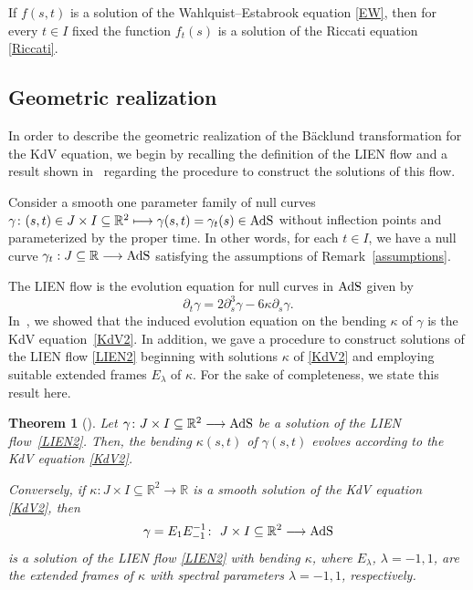 \documentclass[pdftex]{sigma}
\numberwithin{equation}{section}
\newtheorem{Theorem}{Theorem}[section]
\def\bending{\kappa}
\def\R{\mathbb{R}}
\def\AdS{{\rm AdS}}
\begin{document}
\begin{Remark}\label{WE-R}
	If $f(s,t)$ is a solution of the Wahlquist--Estabrook equation \eqref{EW}, then for every $t\in I$ fixed the function $f_t(s)$ is a solution of the Riccati equation \eqref{Riccati}.
\end{Remark}

\subsection{Geometric realization}

In order to describe the geometric realization of the B\"{a}cklund transformation for the KdV equation, we begin by recalling the definition of the LIEN flow and a result shown in~\cite{MP} regarding the procedure to construct the solutions of this flow.

Consider a smooth one parameter family of null curves $\gamma\colon (s,t)\in J\times I\subseteq\R^2\longmapsto \gamma(s,t)=\gamma_t(s)\in\AdS$ without inflection points and parameterized by the proper time. In other words, for each $t\in I$, we have a null curve $\gamma_t:J\subseteq\R\longrightarrow\AdS$ satisfying the assumptions of Remark~\ref{assumptions}.

The LIEN flow is the evolution equation for null curves in $\AdS$ given by
\begin{equation}\label{LIEN2}
	\partial_t\gamma=2\partial_s^3\gamma-6\bending\partial_s\gamma.
\end{equation}
In~\cite{MP}, we showed that the induced evolution equation on the bending $\bending$ of $\gamma$ is the KdV equation~\eqref{KdV2}. In addition, we gave a procedure to construct solutions of the LIEN flow \eqref{LIEN2} beginning with solutions $\bending$ of \eqref{KdV2} and employing suitable extended frames $E_\lambda$ of $\bending$. For the sake of completeness, we state this result here.

\begin{Theorem}[{\cite[Theorem 4.2]{MP}}]\label{induced}
	Let $\gamma\colon J\times I\subseteq\R^2\longrightarrow\AdS$ be a solution of the LIEN flow~\eqref{LIEN2}. Then, the bending $\bending(s,t)$ of $\gamma(s,t)$ evolves according to the KdV equation \eqref{KdV2}.
	
	Conversely, if $\bending\colon J\times I\subseteq\R^2\longrightarrow\R$ is a smooth solution of the KdV equation \eqref{KdV2}, then
	\begin{equation*}%
		\gamma=E_1E_{-1}^{-1}\colon\ J\times I\subseteq\R^2\longrightarrow\AdS
	\end{equation*}
	is a solution of the LIEN flow \eqref{LIEN2} with bending $\bending$, where $E_\lambda$, $\lambda=-1,1$, are the extended frames of $\bending$ with spectral parameters $\lambda=-1,1$, respectively.
\end{Theorem}
\end{document}
